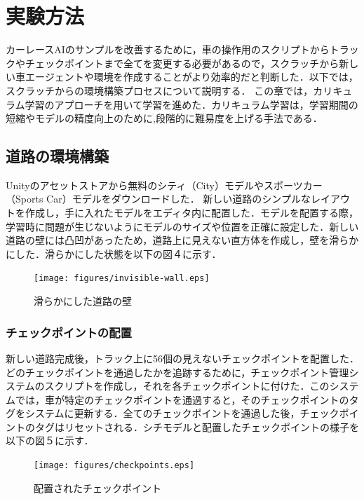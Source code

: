 \section{実験方法}
カーレースAIのサンプルを改善するために，車の操作用のスクリプトからトラックやチェックポイントまで全てを変更する必要があるので，スクラッチから新しい車エージェントや環境を作成することがより効率的だと判断した．以下では，スクラッチからの環境構築プロセスについて説明する．
この章では，カリキュラム学習のアプローチを用いて学習を進めた．カリキュラム学習は，学習期間の短縮やモデルの精度向上のために,段階的に難易度を上げる手法である．

\subsection{道路の環境構築}
Unityのアセットストアから無料のシティ（City）モデルやスポーツカー（Sports Car）モデルをダウンロードした．
新しい道路のシンプルなレイアウトを作成し，手に入れたモデルをエディタ内に配置した．モデルを配置する際，学習時に問題が生じないようにモデルのサイズや位置を正確に設定した．新しい道路の壁には凸凹があったため，道路上に見えない直方体を作成し，壁を滑らかにした．滑らかにした状態を以下の図４に示す．
\begin{figure}[H]
    \centering
    \texttt{[image: figures/invisible-wall.eps]} %
    \caption{滑らかにした道路の壁} %
    \label{fig:invisible-wall} %
\end{figure}

\subsubsection{チェックポイントの配置}
新しい道路完成後，トラック上に56個の見えないチェックポイントを配置した．どのチェックポイントを通過したかを追跡するために，チェックポイント管理システムのスクリプトを作成し，それを各チェックポイントに付けた．このシステムでは，車が特定のチェックポイントを通過すると，そのチェックポイントのタグをシステムに更新する．全てのチェックポイントを通過した後，チェックポイントのタグはリセットされる．シチモデルと配置したチェックポイントの様子を以下の図５に示す．
\begin{figure}[H]
    \centering
    \texttt{[image: figures/checkpoints.eps]} %
    \caption{配置されたチェックポイント} %
    \label{fig:checkpoints} %
\end{figure}


